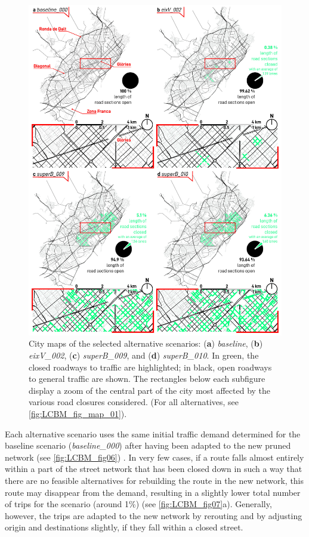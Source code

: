 \begin{figure}[htbp!]
    \centering
    \includegraphics[width=1\textwidth]{LCBM_fig05.jpg}
    \caption{City maps of the selected alternative scenarios: (\textbf{a}) \emph{baseline}, (\textbf{b}) \emph{eixV\_002}, (\textbf{c}) \emph{superB\_009}, and (\textbf{d}) \emph{superB\_010}. In green, the closed roadways to traffic are highlighted; in black, open roadways to general traffic are shown. The rectangles below each subfigure display a zoom of the central part of the city most affected by the various road closures considered. (For all alternatives, see \cref{fig:LCBM_fig_map_01}).}
   \label{fig:LCBM_fig05}
\end{figure}

Each alternative scenario uses the same initial traffic demand determined for the baseline scenario (\emph{baseline\_000}) after having been adapted to the new pruned network (see \cref{fig:LCBM_fig06}) \citep{GermanAerospaceCenterDLRandothers2021}. In very few cases, if a route falls almost entirely within a part of the street network that has been closed down in such a way that there are no feasible alternatives for rebuilding the route in the new network, this route may disappear from the demand, resulting in a slightly lower total number of trips for the scenario (around 1\%) (see \cref{fig:LCBM_fig07}a). Generally, however, the trips are adapted to the new network by rerouting and by adjusting origin and destinations slightly, if they fall within a closed street.


